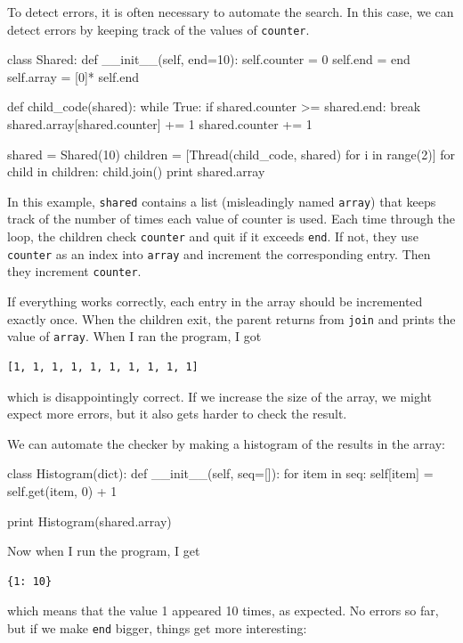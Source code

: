 \documentclass{book}
\begin{document}
To detect errors, it is often necessary to automate the search.
In this case, we can detect errors by keeping track of the values
of {\tt counter}.

\pagebreak
\begin{unbreakable}[]{}
class Shared:
  def __init__(self, end=10):
    self.counter = 0
    self.end = end
    self.array = [0]* self.end

def child_code(shared):
  while True:
    if shared.counter >= shared.end: break
    shared.array[shared.counter] += 1
    shared.counter += 1

shared = Shared(10)
children = [Thread(child_code, shared) 
  for i in range(2)]
for child in children: child.join()
print shared.array
\end{unbreakable}

In this example, {\tt shared} contains a list (misleadingly
named {\tt array}) that keeps track of the number of times
each value of counter is used.
Each time through the loop, the children check {\tt counter}
and quit if it exceeds {\tt end}.  If not, they use {\tt counter}
as an index into {\tt array} and increment the corresponding
entry.  Then they increment {\tt counter}.

If everything works correctly, each entry in the array should
be incremented exactly once.  When the children exit, the parent
returns from {\tt join} and prints the value of {\tt array}.
When I ran the program, I got
%
\begin{verbatim}
[1, 1, 1, 1, 1, 1, 1, 1, 1, 1]
\end{verbatim}
%
which is disappointingly correct.  If we increase the size of
the array, we might expect more errors, but it also gets harder
to check the result.


We can automate the checker by making
a histogram of the results in the array:

\begin{unbreakable}[]{}
class Histogram(dict):
  def __init__(self, seq=[]):
    for item in seq:
      self[item] = self.get(item, 0) + 1

print Histogram(shared.array)
\end{unbreakable}

Now when I run the program, I get

\begin{verbatim}
{1: 10}
\end{verbatim}
%
which means that the value 1 appeared 10 times, as expected.  No
errors so far, but if we make {\tt end} bigger, things get more
interesting:
\end{document}
